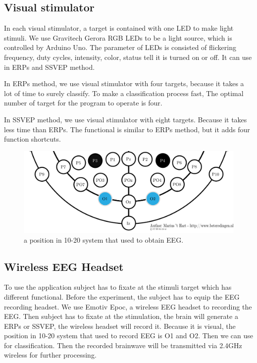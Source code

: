 \subsection{Visual stimulator}

\hspace{1.5cm}In each visual stimulator, a target is contained with one LED to make light stimuli. We use Gravitech Gerora RGB LEDs to be a light source, which is controlled by Arduino Uno.  The parameter of LEDs is consisted of flickering frequency, duty cycles, intensity, color, status tell it is turned on or off. It can use in ERPs and SSVEP method. 

In ERPs method, we use visual stimulator with four targets, because it takes a lot of time to surely classify. To make a classification process fast, The optimal number of target for the program to operate is four.

In SSVEP method, we use visual stimulator with eight targets. Because it takes less time than ERPs. The functional is similar to ERPs method, but it adds four function shortcuts.
\begin{figure}[ht]
	\centering
	\includegraphics[scale = 0.4]{chapter5/emotiv_electrodes_use.pdf}
	\caption{a position in 10-20 system that used to obtain EEG.}
\end{figure}
\subsection{Wireless EEG Headset}
\hspace{1.5cm}To use the application subject has to fixate at the stimuli target which has different functional. Before the experiment, the subject has to equip the EEG recording headset. We use Emotiv Epoc, a wireless EEG headset to recording the EEG. Then subject has to fixate at the stimulation, the brain will generate a ERPs or SSVEP, the wireless headset will record it. Because it is visual, the position in 10-20 system that used to record EEG is O1 and O2. Then we can use for classification. Then the recorded brainwave will be transmitted via 2.4GHz wireless for further processing.

